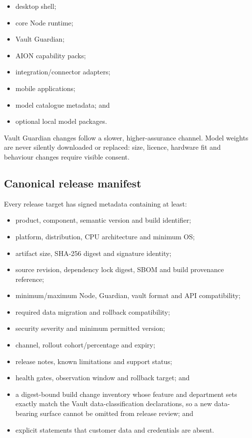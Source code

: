 \documentclass[11pt]{article}
\begin{document}
\begin{itemize}
  \item desktop shell;
  \item core Node runtime;
  \item Vault Guardian;
  \item AION capability packs;
  \item integration/connector adapters;
  \item mobile applications;
  \item model catalogue metadata; and
  \item optional local model packages.
\end{itemize}

Vault Guardian changes follow a slower, higher-assurance channel. Model weights are never silently downloaded or replaced: size, licence, hardware fit and behaviour changes require visible consent.

\subsection{Canonical release manifest}

Every release target has signed metadata containing at least:

\begin{itemize}
  \item product, component, semantic version and build identifier;
  \item platform, distribution, CPU architecture and minimum OS;
  \item artifact size, SHA-256 digest and signature identity;
  \item source revision, dependency lock digest, SBOM and build provenance reference;
  \item minimum/maximum Node, Guardian, vault format and API compatibility;
  \item required data migration and rollback compatibility;
  \item security severity and minimum permitted version;
  \item channel, rollout cohort/percentage and expiry;
  \item release notes, known limitations and support status;
  \item health gates, observation window and rollback target; and
  \item a digest-bound build change inventory whose feature and department sets exactly match the Vault data-classification declarations, so a new data-bearing surface cannot be omitted from release review; and
  \item explicit statements that customer data and credentials are absent.
\end{itemize}
\end{document}
